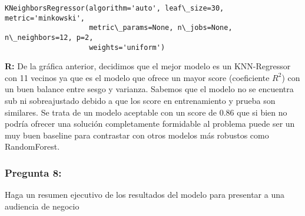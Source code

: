 \documentclass[11pt]{article}
\makeatletter
\newcommand{\boxspacing}{\kern\kvtcb@left@rule\kern\kvtcb@boxsep}
\newcommand{\prompt}[4]{
        {\ttfamily\llap{{\color{#2}[#3]:\hspace{3pt}#4}}\vspace{-\baselineskip}}
    }
\makeatother
\begin{document}
            \begin{tcolorbox}[breakable, size=fbox, boxrule=.5pt, pad at break*=1mm, opacityfill=0]
\prompt{Out}{outcolor}{40}{\boxspacing}
\begin{Verbatim}[commandchars=\\\{\}]
KNeighborsRegressor(algorithm='auto', leaf\_size=30, metric='minkowski',
                    metric\_params=None, n\_jobs=None, n\_neighbors=12, p=2,
                    weights='uniform')
\end{Verbatim}
\end{tcolorbox}
        
    \textbf{R:} De la gráfica anterior, decidimos que el mejor modelo es un
KNN-Regressor con 11 vecinos ya que es el modelo que ofrece un mayor
score (coeficiente \(R^2\)) con un buen balance entre sesgo y varianza.
Sabemos que el modelo no se encuentra sub ni sobreajustado debido a que
los score en entrenamiento y prueba son similares. Se trata de un modelo
aceptable con un score de 0.86 que si bien no podría ofrecer una
solución completamente formidable al problema puede ser un muy buen
baseline para contrastar con otros modelos más robustos como
RandomForest.

    \hypertarget{pregunta-8}{%
\subsubsection{Pregunta 8:}\label{pregunta-8}}

Haga un resumen ejecutivo de los resultados del modelo para presentar a
una audiencia de negocio
\end{document}

